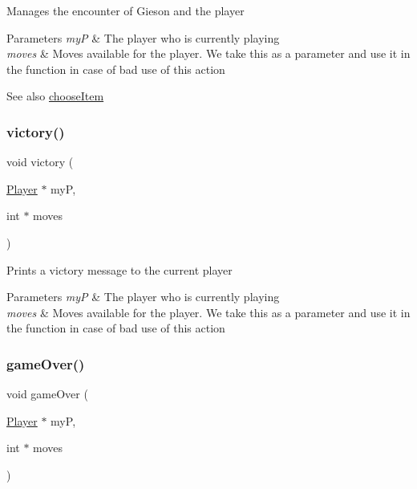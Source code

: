 Manages the encounter of Gieson and the player 
\begin{DoxyParams}{Parameters}
{\em myP} & The player who is currently playing \\
\hline
{\em moves} & Moves available for the player. We take this as a parameter and use it in the function in case of bad use of this action \\
\hline
\end{DoxyParams}
\begin{DoxySeeAlso}{See also}
\hyperlink{group__game_gae64c2690b081867e40de1714f9fa669d}{choose\+Item} 
\end{DoxySeeAlso}
\mbox{\label{group__game_ga83efd39426fa23b683c9ac8edf60ac85}} 
\subsubsection{\texorpdfstring{victory()}{victory()}}
{\footnotesize\ttfamily void victory (\begin{DoxyParamCaption}\item[{\hyperlink{group__game_gac6f795d0d2e88ee469ddc704329e7cc3}{Player} $\ast$}]{myP,  }\item[{int $\ast$}]{moves }\end{DoxyParamCaption})\hspace{0.3cm}{\ttfamily [static]}}

Prints a victory message to the current player 
\begin{DoxyParams}{Parameters}
{\em myP} & The player who is currently playing \\
\hline
{\em moves} & Moves available for the player. We take this as a parameter and use it in the function in case of bad use of this action \\
\hline
\end{DoxyParams}
\mbox{\label{group__game_ga17a56084a7a5dd2f21a5693387271249}} 
\subsubsection{\texorpdfstring{game\+Over()}{gameOver()}}
{\footnotesize\ttfamily void game\+Over (\begin{DoxyParamCaption}\item[{\hyperlink{group__game_gac6f795d0d2e88ee469ddc704329e7cc3}{Player} $\ast$}]{myP,  }\item[{int $\ast$}]{moves }\end{DoxyParamCaption})\hspace{0.3cm}{\ttfamily [static]}}


